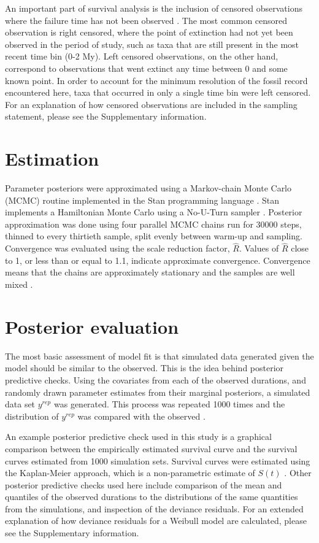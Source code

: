 \documentclass{pnastwo}
\begin{document}
\begin{article}
\begin{materials}
An important part of survival analysis is the inclusion of censored observations where the failure time has not been observed \cite{Ibrahim2001,Klein2003}. The most common censored observation is right censored, where the point of extinction had not yet been observed in the period of study, such as taxa that are still present in the most recent time bin (0-2 My). Left censored observations, on the other hand, correspond to observations that went extinct any time between 0 and some known point. In order to account for the minimum resolution of the fossil record encountered here, taxa that occurred in only a single time bin were left censored. For an explanation of how censored observations are included in the sampling statement, please see the Supplementary information.


\section{Estimation}
Parameter posteriors were approximated using a Markov-chain Monte Carlo (MCMC) routine implemented in the Stan programming language \cite{2014stan}. Stan implements a Hamiltonian Monte Carlo using a No-U-Turn sampler \cite{Hoffman-Gelman:2011}. Posterior approximation was done using four parallel MCMC chains run for 30000 steps, thinned to every thirtieth sample, split evenly between warm-up and sampling. Convergence was evaluated using the scale reduction factor, \(\hat{R}\). Values of \(\hat{R}\) close to 1, or less than or equal to 1.1, indicate approximate convergence. Convergence means that the chains are approximately stationary and the samples are well mixed \cite{Gelman2013d}.


\section{Posterior evaluation}
The most basic assessment of model fit is that simulated data generated given the model should be similar to the observed. This is the idea behind posterior predictive checks. Using the covariates from each of the observed durations, and randomly drawn parameter estimates from their marginal posteriors, a simulated data set \(y^{rep}\) was generated. This process was repeated 1000 times and the distribution of \(y^{rep}\) was compared with the observed \cite{Gelman2013d}.

An example posterior predictive check used in this study is a graphical comparison between the empirically estimated survival curve and the survival curves estimated from 1000 simulation sets. Survival curves were estimated using the Kaplan-Meier approach, which is a non-parametric estimate of \(S(t)\) \cite{Klein2003}. Other posterior predictive checks used here include comparison of the mean and quantiles of the observed durations to the distributions of the same quantities from the simulations, and inspection of the deviance residuals. For an extended explanation of how deviance residuals for a Weibull model are calculated, please see the Supplementary information.


\end{materials}
\end{article}
\end{document}
